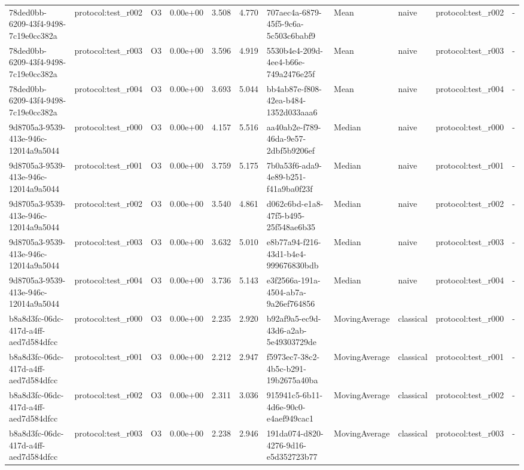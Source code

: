 \begin{table}[htbp]
\begin{tabular}{llrrr}
78ded0bb-6209-43f4-9498-7c19e0cc382a & protocol:test\_r002 & O3 & 0.00e+00 & 3.508 & 4.770 & 707aec4a-6879-45f5-9c6a-5c503c6babf9 & Mean & naive & protocol:test\_r002 & - \\
78ded0bb-6209-43f4-9498-7c19e0cc382a & protocol:test\_r003 & O3 & 0.00e+00 & 3.596 & 4.919 & 5530b4e4-209d-4ee4-b66e-749a2476e25f & Mean & naive & protocol:test\_r003 & - \\
78ded0bb-6209-43f4-9498-7c19e0cc382a & protocol:test\_r004 & O3 & 0.00e+00 & 3.693 & 5.044 & bb4ab87e-f808-42ea-b484-1352d033aaa6 & Mean & naive & protocol:test\_r004 & - \\
9d8705a3-9539-413e-946c-12014a9a5044 & protocol:test\_r000 & O3 & 0.00e+00 & 4.157 & 5.516 & aa40ab2e-f789-46da-9e57-2dbf5b9206ef & Median & naive & protocol:test\_r000 & - \\
9d8705a3-9539-413e-946c-12014a9a5044 & protocol:test\_r001 & O3 & 0.00e+00 & 3.759 & 5.175 & 7b0a53f6-ada9-4e89-b251-f41a9ba0f23f & Median & naive & protocol:test\_r001 & - \\
9d8705a3-9539-413e-946c-12014a9a5044 & protocol:test\_r002 & O3 & 0.00e+00 & 3.540 & 4.861 & d062c6bd-e1a8-47f5-b495-25f548ae6b35 & Median & naive & protocol:test\_r002 & - \\
9d8705a3-9539-413e-946c-12014a9a5044 & protocol:test\_r003 & O3 & 0.00e+00 & 3.632 & 5.010 & e8b77a94-f216-43d1-b4e4-999676830bdb & Median & naive & protocol:test\_r003 & - \\
9d8705a3-9539-413e-946c-12014a9a5044 & protocol:test\_r004 & O3 & 0.00e+00 & 3.736 & 5.143 & e3f2566a-191a-4504-ab7a-9a26ef764856 & Median & naive & protocol:test\_r004 & - \\
b8a8d3fc-06dc-417d-a4ff-aed7d584dfcc & protocol:test\_r000 & O3 & 0.00e+00 & 2.235 & 2.920 & b92af9a5-ec9d-43d6-a2ab-5e49303729de & MovingAverage & classical & protocol:test\_r000 & - \\
b8a8d3fc-06dc-417d-a4ff-aed7d584dfcc & protocol:test\_r001 & O3 & 0.00e+00 & 2.212 & 2.947 & f5973ec7-38c2-4b5c-b291-19b2675a40ba & MovingAverage & classical & protocol:test\_r001 & - \\
b8a8d3fc-06dc-417d-a4ff-aed7d584dfcc & protocol:test\_r002 & O3 & 0.00e+00 & 2.311 & 3.036 & 915941c5-6b11-4d6e-90c0-e4aef949cac1 & MovingAverage & classical & protocol:test\_r002 & - \\
b8a8d3fc-06dc-417d-a4ff-aed7d584dfcc & protocol:test\_r003 & O3 & 0.00e+00 & 2.238 & 2.946 & 191da074-d820-4276-9d16-e5d352723b77 & MovingAverage & classical & protocol:test\_r003 & - \\

\end{tabular}
\end{table}

